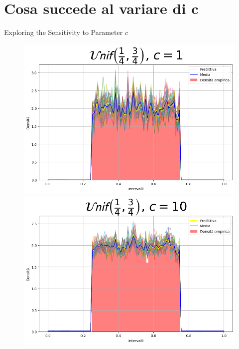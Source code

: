\documentclass{beamer}
\begin{document}
\section{Cosa succede al variare di c}
\begin{frame}{Exploring the Sensitivity to Parameter \(c\)}
    \centering
    \begin{figure}
        \begin{minipage}{0.32\textwidth}
            \centering
            \includegraphics[width=\textwidth]{Unifc1.png}
        \end{minipage}
        \hfill
        \begin{minipage}{0.32\textwidth}
            \centering
            \includegraphics[width=\textwidth]{Unifc10.png}
        \end{minipage}

\end{figure}
\end{frame}
\end{document}
